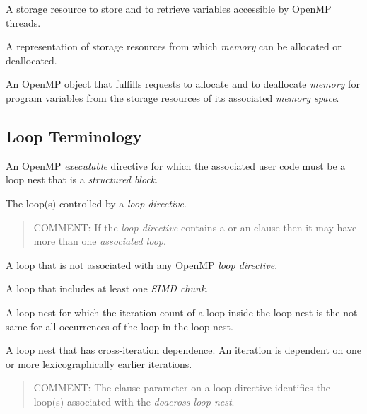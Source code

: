 \glossarydefstart
A storage resource to store and to retrieve variables accessible by OpenMP threads.
\glossarydefend

\glossarydefstart
A representation of storage resources from which \emph{memory} can be allocated or deallocated.
\glossarydefend

\glossarydefstart
An OpenMP object that fulfills requests to allocate and to deallocate \emph{memory} for program variables from the storage resources of its associated \emph{memory space}.
\glossarydefend

%
%
\subsection{Loop Terminology}
\label{subsec:Loop Terminology}
\glossarydefstart
An OpenMP \emph{executable} directive for which the associated user code must be a loop nest that is a \emph{structured block}.
\glossarydefend

\glossarydefstart
The loop(s) controlled by a \emph{loop directive}.
\begin{quote}
COMMENT: If the \emph{loop directive} contains a  or an \code{)} clause then it may have more than one \emph{associated loop}.
\end{quote}
\glossarydefend

\glossarydefstart
A loop that is not associated with any OpenMP \emph{loop directive}.
\glossarydefend

\glossarydefstart
A loop that includes at least one \emph{SIMD chunk}.
\glossarydefend

\glossarydefstart
A loop nest for which the iteration count of a loop inside the loop nest is the
not same for all occurrences of the loop in the loop nest.
\glossarydefend

\glossarydefstart
A loop nest that has cross-iteration dependence. An iteration is dependent on one or more lexicographically earlier iterations.
\begin{quote}
COMMENT: The  clause parameter on a loop directive identifies the loop(s) associated with the \emph{doacross loop nest}.
\end{quote}
\glossarydefend

